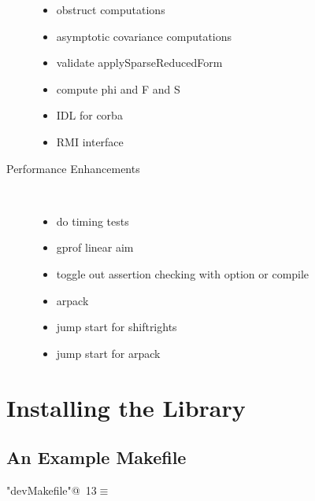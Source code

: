 \documentclass[12pt]{article}
\begin{document}
\begin{description}
\begin{itemize}
\item obstruct computations
\item asymptotic covariance computations
\item validate applySparseReducedForm
\item compute phi and F and S
\item IDL for corba
\item RMI interface
  \end{itemize}
\item[Performance Enhancements] \ 
  \begin{itemize}
\item do timing tests 
\item gprof linear aim
\item toggle out assertion checking with option or compile
\item arpack
\item jump start for shiftrights
\item jump start for arpack
  \end{itemize}
\end{description}
\section{Installing the Library}

\subsection{An Example Makefile}
\label{sec:examplelibmake}


\begin{flushleft} \small
\begin{minipage}{\linewidth}\label{scrap1}\raggedright\small
{} \verb@"devMakefile"@\nobreak\ {\footnotesize {13}}$\equiv$
\vspace{-1ex}
\begin{list}{}{} \item
\mbox{}\verb@@\\
\mbox{}\verb@nada@\\
\mbox{}\verb@@\\
\mbox{}\verb@@{\NWsep}
\end{list}
\vspace{-1.5ex}
\footnotesize
\begin{list}{}{\setlength{\itemsep}{-\parsep}\setlength{\itemindent}{-\leftmargin}}

\item{}
\end{list}
\end{minipage}\vspace{4ex}
\end{flushleft}
\end{document}
